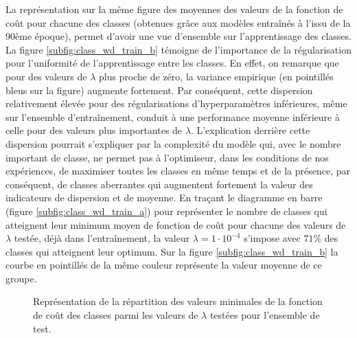 \documentclass[12pt,english, openany]{book}
\begin{document}
La représentation sur la même figure des moyennes des valeurs de la fonction de coût pour chacune des classes (obtenues grâce aux modèles entraînés à l'issu de la 90ème époque), permet d'avoir une vue d'ensemble sur l'apprentissage des classes. La figure \ref{subfig:class_wd_train_b} témoigne de l'importance de la régularisation pour l'uniformité de l'apprentissage entre les classes. En effet, on remarque que pour des valeurs de $\lambda$ plus proche de zéro, la variance empirique (en pointillés bleus sur la figure) augmente fortement. Par conséquent, cette dispersion relativement élevée pour des régularisations d'hyperparamètres inférieures, même sur l'ensemble d'entraînement, conduit à une performance moyenne inférieure à celle pour des valeurs plus importantes de $\lambda$. L'explication derrière cette dispersion pourrait s'expliquer par la complexité du modèle qui, avec le nombre important de classe, ne permet pas à l'optimiseur, dans les conditions de nos expériences, de maximiser toutes les classes en même temps et de la présence, par conséquent, de classes aberrantes qui augmentent fortement la valeur des indicateurs de dispersion et de moyenne. En traçant le diagramme en barre (figure \ref{subfig:class_wd_train_a}) pour représenter le nombre de classes qui atteignent leur minimum moyen de fonction de coût pour chacune des valeurs de $\lambda$ testée, déjà dans l'entraînement, la valeur $\lambda = 1\cdot 10^{-4}$ s'impose avec $71\%$ des classes qui atteignent leur optimum. Sur la figure \ref{subfig:class_wd_train_b} la courbe en pointillés de la même couleur représente la valeur moyenne de ce groupe. \\

\begin{figure}[H]
  \centering
  \hfill
  \hfill
  \caption{Représentation de la répartition des valeurs minimales de la fonction de coût des classes parmi les valeurs de $\lambda$ testées pour l'ensemble de test.}
  \label{fig:class_wd_test}
\end{figure}
\end{document}
